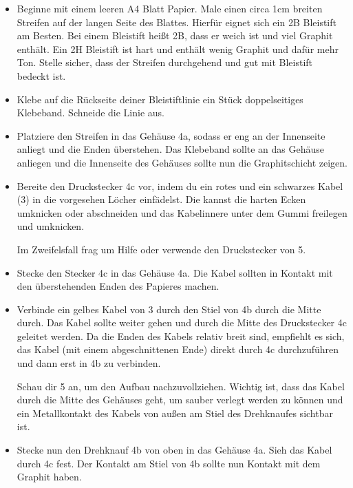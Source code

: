 \documentclass[a4paper,12pt]{book}
\begin{document}
\begin{instruction}
  \begin{itemize}
    \item 
      Beginne mit einem leeren A4 Blatt Papier.
      Male einen circa 1cm breiten Streifen auf der langen Seite des Blattes.
      Hierfür eignet sich ein 2B Bleistift am Besten.
      Bei einem Bleistift heißt 2B, dass er weich ist und viel Graphit enthält.
      Ein 2H Bleistift ist hart und enthält wenig Graphit und dafür mehr Ton.
      Stelle sicher, dass der Streifen durchgehend und gut mit Bleistift bedeckt ist.
    \item
      Klebe auf die Rückseite deiner Bleistiftlinie ein Stück doppelseitiges Klebeband.
      Schneide die Linie aus.
    \item
      Platziere den Streifen in das Gehäuse 4a, sodass er eng an der Innenseite anliegt und die 
      Enden überstehen.
      Das Klebeband sollte an das Gehäuse anliegen und die Innenseite des Gehäuses sollte nun
      die Graphitschicht zeigen.
    \item
      Bereite den Druckstecker 4c vor, indem du ein rotes und ein schwarzes Kabel (3) in die 
      vorgesehen Löcher einfädelst.
      Die kannst die harten Ecken umknicken oder abschneiden und das Kabelinnere unter dem Gummi freilegen
      und umknicken.

      Im Zweifelsfall frag um Hilfe oder verwende den Druckstecker von 5.
    \item
      Stecke den Stecker 4c in das Gehäuse 4a. Die Kabel sollten in Kontakt mit den überstehenden Enden des Papieres machen.
    \item
      Verbinde ein gelbes Kabel von 3 durch den Stiel von 4b durch die Mitte durch.
      Das Kabel sollte weiter gehen und durch die Mitte des Druckstecker 4c geleitet werden.
      Da die Enden des Kabels relativ breit sind, empfiehlt es sich, das Kabel (mit einem abgeschnittenen Ende) direkt durch 4c
      durchzuführen und dann erst in 4b zu verbinden.

      Schau dir 5 an, um den Aufbau nachzuvollziehen.
      Wichtig ist, dass das Kabel durch die Mitte des Gehäuses geht, um sauber verlegt werden zu können
      und ein Metallkontakt des Kabels von außen am Stiel des Drehknaufes sichtbar ist.
    \item
      Stecke nun den Drehknauf 4b von oben in das Gehäuse 4a.
      Sieh das Kabel durch 4c fest.
      Der Kontakt am Stiel von 4b sollte nun Kontakt mit dem Graphit haben.
  \end{itemize}
\end{instruction}
\end{document}
